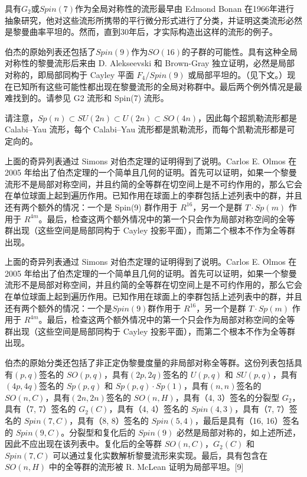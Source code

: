 具有\(G_2\)或\(Spin(7)\)作为全局对称性的流形最早由 Edmond Bonan 在1966年进行抽象研究，他对这些流形所携带的平行微分形式进行了分类，并证明这类流形必然是黎曼曲率平坦的。然而，直到30年后，才实际构造出这样的流形的例子。

伯杰的原始列表还包括了\(Spin(9)\)作为\(SO(16)\)的子群的可能性。具有这种全局对称性的黎曼流形后来由 D. Alekseevski 和 Brown-Gray 独立证明，必然是局部对称的，即局部同构于 Cayley 平面 \( F_4 / Spin(9) \) 或局部平坦的。（见下文。）现在已知所有这些可能性都出现在黎曼流形的全局对称群中。最后两个例外情况是最难找到的。请参见 G2 流形和 Spin(7) 流形。

请注意，\( Sp(n) \subset SU(2n) \subset U(2n) \subset SO(4n) \)，因此每个超凯勒流形都是 Calabi–Yau 流形，每个 Calabi–Yau 流形都是凯勒流形，而每个凯勒流形都是可定向的。

上面的奇异列表通过 Simons 对伯杰定理的证明得到了说明。Carlos E. Olmos 在 2005 年给出了伯杰定理的一个简单且几何的证明。首先可以证明，如果一个黎曼流形不是局部对称空间，并且约简的全等群在切空间上是不可约作用的，那么它会在单位球面上起到遍历作用。已知作用在球面上的李群包括上述列表中的群，并且还有两个额外的情况：一个是 Spin(9) 群作用于 \( R^{16} \)，另一个是群 \( T \cdot Sp(m) \) 作用于 \( R^{4m} \)。最后，检查这两个额外情况中的第一个只会作为局部对称空间的全等群出现（这些空间是局部同构于 Cayley 投影平面），而第二个根本不作为全等群出现。

上面的奇异列表通过 Simons 对伯杰定理的证明得到了说明。Carlos E. Olmos 在 2005 年给出了伯杰定理的一个简单且几何的证明。首先可以证明，如果一个黎曼流形不是局部对称空间，并且约简的全等群在切空间上是不可约作用的，那么它会在单位球面上起到遍历作用。已知作用在球面上的李群包括上述列表中的群，并且还有两个额外的情况：一个是\(Spin(9)\)群作用于 \( R^{16} \)，另一个是群 \( T \cdot Sp(m) \) 作用于 \( R^{4m} \)。最后，检查这两个额外情况中的第一个只会作为局部对称空间的全等群出现（这些空间是局部同构于 Cayley 投影平面），而第二个根本不作为全等群出现。

伯杰的原始分类还包括了非正定伪黎曼度量的非局部对称全等群。这份列表包括具有\((p, q)\)签名的 \( SO(p, q) \)，具有\((2p, 2q)\)签名的 \( U(p, q) \) 和 \( SU(p, q) \)，具有\((4p,4q)\)签名的 \( Sp(p, q) \) 和 \( Sp(p, q) \cdot Sp(1) \)，具有\((n, n)\)签名的 \( SO(n, C) \)，具有\((2n, 2n)\)签名的 \( SO(n, H) \)，具有（4, 3）签名的分裂型 \( G_2 \)，具有（7, 7）签名的 \( G_2(C) \)，具有（4, 4）签名的 \( Spin(4, 3) \)，具有（7, 7）签名的 \( Spin(7, C) \)，具有（8, 8）签名的 \( Spin(5, 4) \)，最后是具有（16, 16）签名的 \( Spin(9, C) \)。分裂型和复化后的 \( Spin(9) \) 必然是局部对称的，如上述所述，因此不应出现在该列表中。复化后的全等群 \( SO(n, C) \)，\( G_2(C) \) 和 \( Spin(7, C) \) 可以通过复化实数解析黎曼流形来实现。最后，具有包含在 \( SO(n, H) \) 中的全等群的流形被 R. McLean 证明为局部平坦。[9]


